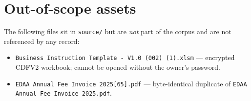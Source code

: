 \section{Out-of-scope assets}

The following files sit in
\corpus\texttt{source/} but are \emph{not} part of the corpus and
are not referenced by any record:

\begin{itemize}
  \item \texttt{Business Instruction Template - V1.0 (002) (1).xlsm} ---
        encrypted CDFV2 workbook; cannot be opened without the owner's
        password.
  \item \texttt{EDAA Annual Fee Invoice 2025[65].pdf} --- byte-identical
        duplicate of \texttt{EDAA Annual Fee Invoice 2025.pdf}.
\end{itemize}
